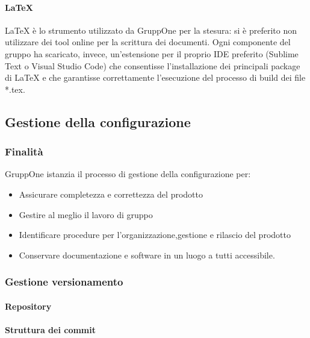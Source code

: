 \documentclass[../norme-di-progetto.tex]{subfiles}
\begin{document}
\paragraph{\LaTeX}%
\label{par:LaTeX}
\LaTeX{} è lo strumento utilizzato da GruppOne per la stesura: si è preferito non utilizzare dei tool online per la scrittura dei documenti.
Ogni componente del gruppo ha scaricato, invece, un'estensione per il proprio IDE preferito (Sublime Text o Visual Studio Code) che consentisse l'installazione dei principali package di \LaTeX{} e che garantisse correttamente l'esecuzione del processo di build dei file *.tex.

\subsection{Gestione della configurazione}%
\label{sub:gestione_della_configurazione}

\subsubsection{Finalità}%
\label{subs:gestione_della_configurazione/finalita}

GruppOne istanzia il processo di gestione della configurazione per:
\begin{itemize}
  \item Assicurare completezza e correttezza del prodotto
  \item Gestire al meglio il lavoro di gruppo
  \item Identificare procedure per l'organizzazione,gestione e rilascio del prodotto
  \item Conservare documentazione e software in un luogo a tutti accessibile.
\end{itemize}

\subsubsection{Gestione versionamento}%
\label{subs:gestione_versionamento}

\paragraph{Repository}%
\label{par:repository}

\paragraph{Struttura dei commit}%
\label{par:struttura_dei_commit}
\end{document}
